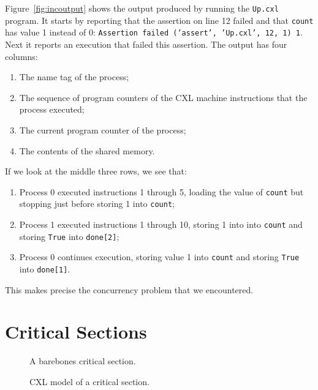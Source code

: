 \documentclass{report}
\newenvironment{code}{
\tcolorbox
}{
\endtcolorbox
}
\begin{document}
Figure~\ref{fig:incoutput} shows the output produced by running the
\texttt{Up.cxl} program.
It starts by reporting that the assertion on line 12 failed and that
\texttt{count} has value 1 instead of 0:
\texttt{Assertion failed (’assert’, ’Up.cxl’, 12, 1) 1}.
Next it reports an execution that failed this assertion.  The output has
four columns:
\begin{enumerate}
\item The name tag of the process;
\item The sequence of program counters of the CXL machine instructions that the process executed;
\item The current program counter of the process;
\item The contents of the shared memory.
\end{enumerate}

If we look at the middle three rows, we see that:
\begin{enumerate}
\item Process 0 executed instructions 1 through 5, loading the value of
\texttt{count} but stopping just before storing 1 into \texttt{count};
\item Process 1 executed instructions 1 through 10, storing 1 into
into \texttt{count} and storing \texttt{True} into \texttt{done[2]};
\item Process 0 continues execution, storing value 1 into \texttt{count}
and storing \texttt{True} into \texttt{done[1]}.
\end{enumerate}

This makes precise the concurrency problem that we encountered.

\chapter{Critical Sections}

\begin{figure}
\begin{code}

\end{code}
\caption{A barebones critical section.}
\label{fig:csbarebones}
\end{figure}

\begin{figure}
\begin{code}

\end{code}
\caption{CXL model of a critical section.}
\label{fig:cs}
\end{figure}
\end{document}
